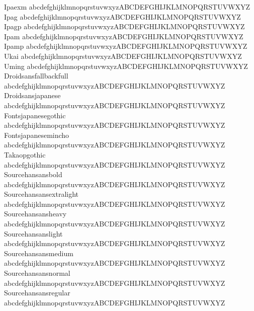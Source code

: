 \begin{tabbing}
Ipaexm \> {\mktsFontfileIpaexm{}abcdefghijklmnopqrstuvwxyzABCDEFGHIJKLMNOPQRSTUVWXYZ} \\
Ipag \> {\mktsFontfileIpag{}abcdefghijklmnopqrstuvwxyzABCDEFGHIJKLMNOPQRSTUVWXYZ} \\
Ipagp \> {\mktsFontfileIpagp{}abcdefghijklmnopqrstuvwxyzABCDEFGHIJKLMNOPQRSTUVWXYZ} \\
Ipam \> {\mktsFontfileIpam{}abcdefghijklmnopqrstuvwxyzABCDEFGHIJKLMNOPQRSTUVWXYZ} \\
Ipamp \> {\mktsFontfileIpamp{}abcdefghijklmnopqrstuvwxyzABCDEFGHIJKLMNOPQRSTUVWXYZ} \\
Ukai \> {\mktsFontfileUkai{}abcdefghijklmnopqrstuvwxyzABCDEFGHIJKLMNOPQRSTUVWXYZ} \\
Uming \> {\mktsFontfileUming{}abcdefghijklmnopqrstuvwxyzABCDEFGHIJKLMNOPQRSTUVWXYZ} \\
Droidsansfallbackfull \> {\mktsFontfileDroidsansfallbackfull{}abcdefghijklmnopqrstuvwxyzABCDEFGHIJKLMNOPQRSTUVWXYZ} \\
Droidsansjapanese \> {\mktsFontfileDroidsansjapanese{}abcdefghijklmnopqrstuvwxyzABCDEFGHIJKLMNOPQRSTUVWXYZ} \\
Fontsjapanesegothic \> {\mktsFontfileFontsjapanesegothic{}abcdefghijklmnopqrstuvwxyzABCDEFGHIJKLMNOPQRSTUVWXYZ} \\
Fontsjapanesemincho \> {\mktsFontfileFontsjapanesemincho{}abcdefghijklmnopqrstuvwxyzABCDEFGHIJKLMNOPQRSTUVWXYZ} \\
Takaopgothic \> {\mktsFontfileTakaopgothic{}abcdefghijklmnopqrstuvwxyzABCDEFGHIJKLMNOPQRSTUVWXYZ} \\
Sourcehansansbold \> {\mktsFontfileSourcehansansbold{}abcdefghijklmnopqrstuvwxyzABCDEFGHIJKLMNOPQRSTUVWXYZ} \\
Sourcehansansextralight \> {\mktsFontfileSourcehansansextralight{}abcdefghijklmnopqrstuvwxyzABCDEFGHIJKLMNOPQRSTUVWXYZ} \\
Sourcehansansheavy \> {\mktsFontfileSourcehansansheavy{}abcdefghijklmnopqrstuvwxyzABCDEFGHIJKLMNOPQRSTUVWXYZ} \\
Sourcehansanslight \> {\mktsFontfileSourcehansanslight{}abcdefghijklmnopqrstuvwxyzABCDEFGHIJKLMNOPQRSTUVWXYZ} \\
Sourcehansansmedium \> {\mktsFontfileSourcehansansmedium{}abcdefghijklmnopqrstuvwxyzABCDEFGHIJKLMNOPQRSTUVWXYZ} \\
Sourcehansansnormal \> {\mktsFontfileSourcehansansnormal{}abcdefghijklmnopqrstuvwxyzABCDEFGHIJKLMNOPQRSTUVWXYZ} \\
Sourcehansansregular \> {\mktsFontfileSourcehansansregular{}abcdefghijklmnopqrstuvwxyzABCDEFGHIJKLMNOPQRSTUVWXYZ} \\
\end{tabbing}



